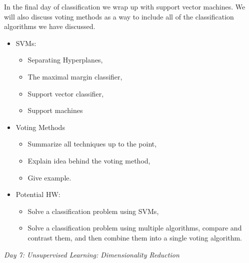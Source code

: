 \documentclass[12pt]{article}
\begin{document}
	\noindent
	In the final day of classification we wrap up with support vector machines. We will also discuss voting methods as a way to include all of the classification algorithms we have discussed.
	\begin{itemize}
		\item SVMs:
			\begin{itemize}
				\item Separating Hyperplanes,
				\item The maximal margin classifier,
				\item Support vector classifier,
				\item Support machines
			\end{itemize}
		\item Voting Methods
			\begin{itemize}
				\item Summarize all techniques up to the point,
				\item Explain idea behind the voting method,
				\item Give example.
			\end{itemize}
		\item Potential HW:
			\begin{itemize}
				\item Solve a classification problem using SVMs,
				\item Solve a classification problem using multiple algorithms, compare and contrast them, and then combine them into a single voting algorithm.
			\end{itemize}
	\end{itemize}
	
	\vspace{2mm}
	\noindent
	\textit{\large{Day 7: Unsupervised Learning: Dimensionality Reduction}}
	
\end{document}
